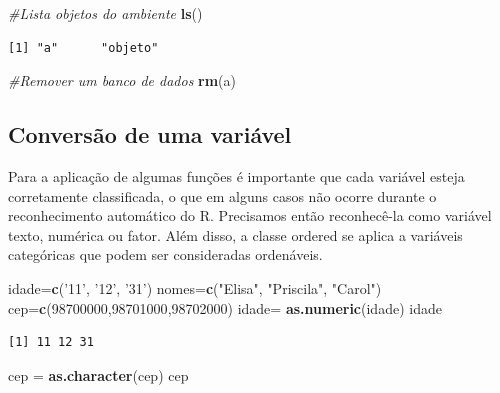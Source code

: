 \documentclass[12pt,brazil,oneside]{book}
\newenvironment{Shaded}{\begin{snugshade}}{\end{snugshade}}
\newcommand{\CommentTok}[1]{\textcolor[rgb]{0.56,0.35,0.01}{\textit{#1}}}
\newcommand{\DecValTok}[1]{\textcolor[rgb]{0.00,0.00,0.81}{#1}}
\newcommand{\KeywordTok}[1]{\textcolor[rgb]{0.13,0.29,0.53}{\textbf{#1}}}
\newcommand{\NormalTok}[1]{#1}
\newcommand{\StringTok}[1]{\textcolor[rgb]{0.31,0.60,0.02}{#1}}
\begin{document}
\begin{Shaded}
\begin{Highlighting}[]
\CommentTok{#Lista objetos do ambiente}
\KeywordTok{ls}\NormalTok{()}
\end{Highlighting}
\end{Shaded}

\begin{verbatim}
[1] "a"      "objeto"
\end{verbatim}

\begin{Shaded}
\begin{Highlighting}[]
\CommentTok{#Remover um banco de dados}
\KeywordTok{rm}\NormalTok{(a)}
\end{Highlighting}
\end{Shaded}

\hypertarget{conversao-de-uma-variavel}{%
\subsection{Conversão de uma variável}\label{conversao-de-uma-variavel}}

Para a aplicação de algumas funções é importante que cada variável
esteja corretamente classificada, o que em alguns casos não ocorre
durante o reconhecimento automático do R. Precisamos então reconhecê-la
como variável texto, numérica ou fator. Além disso, a classe ordered se
aplica a variáveis categóricas que podem ser consideradas ordenáveis.

\begin{Shaded}
\begin{Highlighting}[]
\NormalTok{idade=}\KeywordTok{c}\NormalTok{(}\StringTok{'11'}\NormalTok{, }\StringTok{'12'}\NormalTok{, }\StringTok{'31'}\NormalTok{)}
\NormalTok{nomes=}\KeywordTok{c}\NormalTok{(}\StringTok{"Elisa"}\NormalTok{, }\StringTok{"Priscila"}\NormalTok{, }\StringTok{"Carol"}\NormalTok{)}
\NormalTok{cep=}\KeywordTok{c}\NormalTok{(}\DecValTok{98700000}\NormalTok{,}\DecValTok{98701000}\NormalTok{,}\DecValTok{98702000}\NormalTok{)}
\NormalTok{idade=}\StringTok{ }\KeywordTok{as.numeric}\NormalTok{(idade)}
\NormalTok{idade}
\end{Highlighting}
\end{Shaded}

\begin{verbatim}
[1] 11 12 31
\end{verbatim}

\begin{Shaded}
\begin{Highlighting}[]
\NormalTok{cep =}\StringTok{ }\KeywordTok{as.character}\NormalTok{(cep)}
\NormalTok{cep}
\end{Highlighting}
\end{Shaded}
\end{document}
